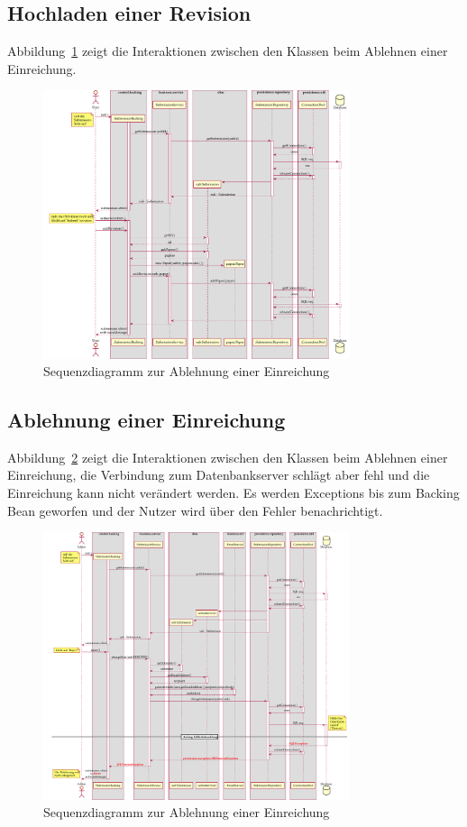 
\subsection{Hochladen einer Revision}\label{subsec:sequenz-revision-hochladen}

Abbildung~\ref{fig:upload-revision-sequence} zeigt die Interaktionen zwischen den Klassen beim Ablehnen einer Einreichung.

\begin{figure}[H]
    \centering
    \includegraphics[width=0.8\textwidth]{graphics/upload_revision}
    \caption{Sequenzdiagramm zur Ablehnung einer Einreichung}
    \label{fig:upload-revision-sequence}
\end{figure}

\subsection{Ablehnung einer Einreichung}\label{subsec:sequenz-ablehnung}

Abbildung~\ref{fig:rejection-sequence} zeigt die Interaktionen zwischen den Klassen beim Ablehnen einer Einreichung, die Verbindung zum Datenbankserver schlägt aber fehl und die Einreichung kann nicht verändert werden. Es werden Exceptions bis zum Backing Bean geworfen und der Nutzer wird über den Fehler benachrichtigt.

\begin{figure}[H]
    \centering
    \includegraphics[width=0.8\textwidth]{graphics/reject_submission}
    \caption{Sequenzdiagramm zur Ablehnung einer Einreichung}
    \label{fig:rejection-sequence}
\end{figure}
